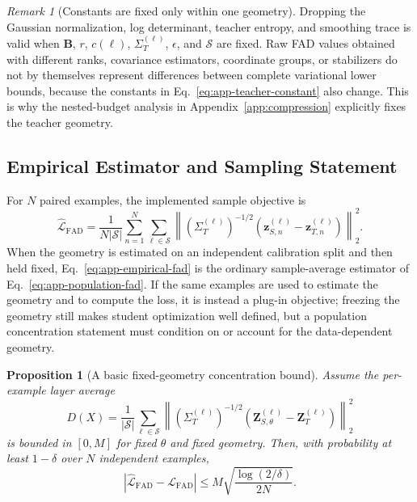 \documentclass{article}
\newcommand{\calL}{\mathcal{L}}
\newcommand{\calS}{\mathcal{S}}
\newcommand{\FAD}{\mathrm{FAD}}
\newcommand{\bB}{\boldsymbol{B}}
\newcommand{\bz}{\boldsymbol{z}}
\newcommand{\bSigma}{\varSigma}
\theoremstyle{plain}
\newtheorem{proposition}[theorem]{Proposition}
\theoremstyle{definition}
\theoremstyle{remark}
\newtheorem{remark}{Remark}
\begin{document}
\begin{remark}[Constants are fixed only within one geometry]
\label{rem:app-fixed-geometry}
Dropping the Gaussian normalization, log determinant, teacher entropy, and
smoothing trace is valid when $\bB$, $r$, $c(\ell)$,
$\bSigma_T^{(\ell)}$, $\epsilon$, and $\calS$ are fixed.  Raw FAD values obtained
with different ranks, covariance estimators, coordinate groups, or stabilizers do
not by themselves represent differences between complete variational lower bounds,
because the constants in Eq.~\eqref{eq:app-teacher-constant} also change.  This is why the nested-budget analysis in Appendix~\ref{app:compression}
explicitly fixes the teacher geometry.
\end{remark}

\subsection{Empirical Estimator and Sampling Statement}
\label{app:empirical-fad}

For $N$ paired examples, the implemented sample objective is
\begin{equation}
  \widehat{\calL}_{\FAD}
  =\frac{1}{N|\calS|}\sum_{n=1}^{N}\sum_{\ell\in\calS}
  \left\|(\bSigma_T^{(\ell)})^{-1/2}
  (\bz_{S,n}^{(\ell)}-\bz_{T,n}^{(\ell)})\right\|_2^2.
  \label{eq:app-empirical-fad}
\end{equation}
When the geometry is estimated on an independent calibration split and then held
fixed, Eq.~\eqref{eq:app-empirical-fad} is the ordinary sample-average estimator of
Eq.~\eqref{eq:app-population-fad}.  If the same examples are used to estimate the
geometry and to compute the loss, it is instead a plug-in objective; freezing the
geometry still makes student optimization well defined, but a population
concentration statement must condition on or account for the data-dependent
geometry.

\begin{proposition}[A basic fixed-geometry concentration bound]
\label{prop:app-fad-concentration}
Assume the per-example layer average
\begin{equation}
  D(X)=\frac{1}{|\calS|}\sum_{\ell\in\calS}
  \left\|(\bSigma_T^{(\ell)})^{-1/2}
  (\boldsymbol Z_{S,\theta}^{(\ell)}-
  \boldsymbol Z_T^{(\ell)})\right\|_2^2
  \label{eq:app-bounded-sample-loss}
\end{equation}
is bounded in $[0,M]$ for fixed $\theta$ and fixed geometry.  Then, with
probability at least $1-\delta$ over $N$ independent examples,
\begin{equation}
  \left|\widehat{\calL}_{\FAD}-\calL_{\FAD}\right|
  \le M\sqrt{\frac{\log(2/\delta)}{2N}}.
  \label{eq:app-hoeffding-fad}
\end{equation}
\end{proposition}
\end{document}
